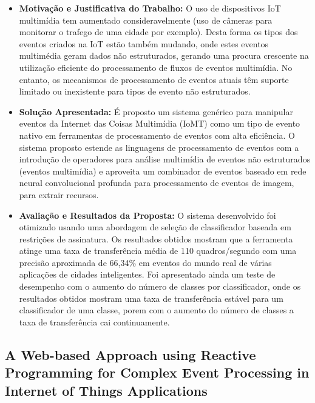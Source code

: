 \documentclass[tid,table]{texufpel} %
\begin{document}
\begin{itemize}
	\item \textbf{Motivação e Justificativa do Trabalho:} O uso de dispositivos IoT multimídia tem aumentado consideravelmente (uso de câmeras para monitorar o trafego de uma cidade por exemplo). Desta forma os tipos dos eventos criados na IoT estão também mudando, onde estes eventos multimédia geram dados não estruturados, gerando uma procura crescente na utilização eficiente do processamento de fluxos de eventos multimídia. No entanto, os mecanismos de processamento de eventos atuais têm suporte limitado ou inexistente para tipos de evento não estruturados.
	
	\item \textbf{Solução Apresentada:} É proposto um sistema genérico para manipular eventos da Internet das Coisas Multimídia (IoMT) como um tipo de evento nativo em ferramentas de processamento de eventos com alta eficiência. O sistema proposto estende as linguagens de processamento de eventos com a introdução de operadores para análise multimídia de eventos não estruturados (eventos multimídia) e aproveita um combinador de eventos baseado em rede neural convolucional profunda para processamento de eventos de imagem, para extrair recursos.
	
	\item \textbf{Avaliação e Resultados da Proposta:} O sistema desenvolvido foi otimizado usando uma abordagem de seleção de classificador baseada em restrições de assinatura. Os resultados obtidos mostram que a ferramenta atinge uma taxa de transferência média de 110 quadros/segundo com uma precisão aproximada de 66,34\% em eventos do mundo real de várias aplicações de cidades inteligentes. Foi apresentado ainda um teste de desempenho com o aumento do número de classes por classificador, onde os resultados obtidos mostram uma taxa de transferência estável para um classificador de uma classe, porem com o aumento do número de classes a taxa de transferência cai continuamente.  
	
\end{itemize}


\subsection{A Web-based Approach using Reactive Programming for Complex Event Processing in Internet of Things Applications}
\end{document}
